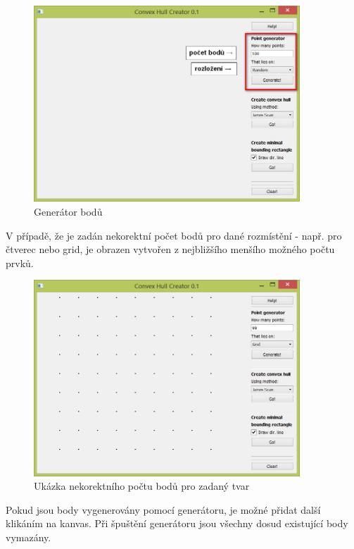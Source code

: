 \documentclass[a4paper, 12pt]{article}
\begin{document}
\begin{figure}[h]
	\centering
	\includegraphics[width=10cm]{vstup_nastaveni.jpg}
	\caption{Generátor bodů}
\end{figure}
 
V případě, že je zadán nekorektní počet bodů pro dané rozmístění - např. pro čtverec nebo grid, je obrazen vytvořen z nejbližšího menšího možného počtu prvků.

\begin{figure}[h]
	\centering
	\includegraphics[width=10cm]{vstup.jpg}
	\caption{Ukázka nekorektního počtu bodů pro zadaný tvar}
\end{figure}
 
Pokud jsou body vygenerovány pomocí generátoru, je možné přidat další klikáním na kanvas.
Při špuštění generátoru jsou všechny dosud existující body vymazány.

\clearpage
\end{document}
